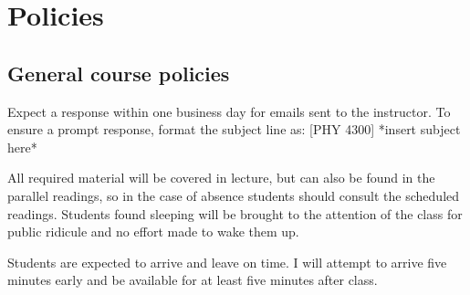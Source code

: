 \documentclass{syllabus}
\begin{document}
\section*{Policies}
\subsection*{General course policies}
Expect a response within one business day for emails sent to the instructor. To ensure a prompt response, format the subject line as: [PHY 4300] *insert subject here*

All required material will be covered in lecture, but can also be found in the parallel readings, so in the case of absence students should consult the scheduled readings. Students found sleeping will be brought to the attention of the class for public ridicule and no effort made to wake them up.

Students are expected to arrive and leave on time. I will attempt to arrive five minutes early and be available for at least five minutes after class.

\collegepolicies
\end{document}
